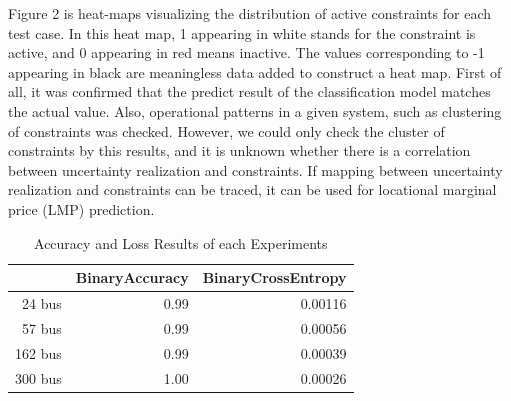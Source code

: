 \documentclass[11pt]{article}
\begin{document}
Figure 2 is heat-maps visualizing the distribution of active constraints for each test case. In this heat map, 1 appearing in white stands for the constraint is active, and 0 appearing in red means inactive. The values corresponding to -1 appearing in black are meaningless data added to construct a heat map. 
First of all, it was confirmed that the predict result of the classification model matches the actual value. Also, operational patterns in a given system, such as clustering of constraints was checked. However, we could only check the cluster of constraints by this results, and it is unknown whether there is a correlation between uncertainty realization and constraints. If mapping between uncertainty realization and constraints can be traced, it can be used for locational marginal price (LMP) prediction.



\begin{table}[h]
\centering
\begin{tabular}{|r|r|r|}
\hline
        & BinaryAccuracy & BinaryCrossEntropy \\ \hline
24 bus  & 0.99           & 0.00116            \\ \hline
57 bus  & 0.99           & 0.00056            \\ \hline
162 bus & 0.99           & 0.00039            \\ \hline
300 bus & 1.00           & 0.00026            \\ \hline
\end{tabular}
\caption{Accuracy and Loss Results of each Experiments}
\end{table}
\end{document}

